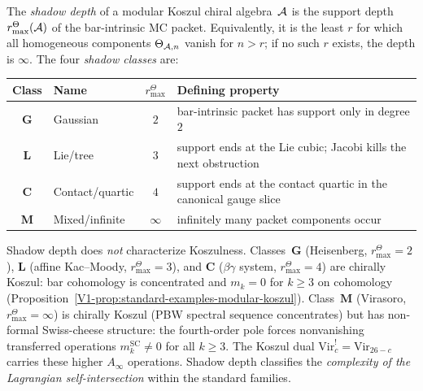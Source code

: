 \begin{definition}
The \emph{shadow depth} of a modular Koszul chiral
algebra~$\mathcal{A}$ is the support depth \(r^\Theta_{\max}(\mathcal{A})\) of the
bar-intrinsic MC packet.  Equivalently, it is the least \(r\) for
which all homogeneous components \(\Theta_{\mathcal{A},n}\) vanish for
\(n>r\); if no such \(r\) exists, the depth is \(\infty\).
The four \emph{shadow classes} are:
\begin{center}
\renewcommand{\arraystretch}{1.4}
\begin{tabular}{clcl}
\toprule
Class & Name & $r^\Theta_{\max}$ & Defining property \\
\midrule
\textbf{G} & Gaussian & $2$
 & bar-intrinsic packet has support only in degree \(2\) \\
\textbf{L} & Lie/tree & $3$
 & support ends at the Lie cubic; Jacobi kills the next obstruction \\
\textbf{C} & Contact/quartic & $4$
 & support ends at the contact quartic in the canonical gauge slice \\
\textbf{M} & Mixed/infinite & $\infty$
 & infinitely many packet components occur \\
\bottomrule
\end{tabular}
\end{center}
\end{definition}

\begin{remark}
Shadow depth does \emph{not} characterize Koszulness.
Classes~$\mathbf{G}$ (Heisenberg, \(r^\Theta_{\max} = 2\)),
$\mathbf{L}$ (affine Kac--Moody, \(r^\Theta_{\max} = 3\)), and
$\mathbf{C}$ ($\beta\gamma$ system, \(r^\Theta_{\max} = 4\)) are
chirally Koszul: bar cohomology is concentrated and
$m_k = 0$ for $k \ge 3$ on cohomology
(Proposition~\ref{V1-prop:standard-examples-modular-koszul}).
Class~$\mathbf{M}$ (Virasoro, \(r^\Theta_{\max} = \infty\)) is
chirally Koszul (PBW spectral sequence concentrates) but has
non-formal Swiss-cheese structure: the fourth-order pole forces
nonvanishing transferred operations $m_k^{\mathrm{SC}} \neq 0$
for all $k \geq 3$. The Koszul dual
$\mathrm{Vir}_c^! = \mathrm{Vir}_{26-c}$ carries
these higher $A_\infty$ operations. Shadow depth classifies the
\emph{complexity of the Lagrangian self-intersection}
within the standard families.
\end{remark}

